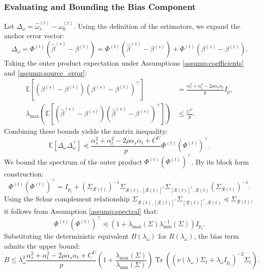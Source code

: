 \documentclass{article}
\begin{document}
\subsubsection{Evaluating and Bounding the Bias Component}
Let $\Delta_\omega = \hat\omega_s^{(t)} - \omega_0^{(t)}$. Using the definition of the estimators, we expand the anchor error vector:
\begin{equation}
\Delta_\omega = \Phi^{(t)}(\hat\beta^{(s)} - \beta^{(t)}) = \Phi^{(t)}(\hat\beta^{(s)} - \beta^{(s)}) + \Phi^{(t)}(\beta^{(s)} - \beta^{(t)}).
\end{equation}
Taking the outer product expectation under Assumptions \ref{assump:coefficients} and \ref{assump:source_error}:
\begin{align}
\mathbb{E}[(\beta^{(s)} - \beta^{(t)})(\beta^{(s)} - \beta^{(t)})^\top] &= \frac{\alpha_s^2 + \alpha_t^2 - 2 \rho \alpha_s \alpha_t}{p} I_p, \\
\lambda_{\max}\left(\mathbb{E}[(\hat\beta^{(s)} - \beta^{(s)})(\hat\beta^{(s)} - \beta^{(s)})^\top]\right) &\le \frac{C^U}{p}.
\end{align}
Combining these bounds yields the matrix inequality:
\begin{equation}
\mathbb{E}[\Delta_\omega \Delta_\omega^\top] \preceq \frac{\alpha_s^2 + \alpha_t^2 - 2 \rho \alpha_s \alpha_t + C^U}{p} \Phi^{(t)} (\Phi^{(t)})^\top.
\end{equation}
We bound the spectrum of the outer product $\Phi^{(t)} (\Phi^{(t)})^\top$. By its block form construction:
\begin{equation}
\Phi^{(t)} (\Phi^{(t)})^\top = I_{p_t} + \left(\Sigma_{\mathcal{R}(t)}\right)^{-1} \Sigma_{\mathcal{R}(t), [\mathcal{R}(t)]^c} \Sigma_{[\mathcal{R}(t)]^c, \mathcal{R}(t)} \left(\Sigma_{\mathcal{R}(t)}\right)^{-1}.
\end{equation}
Using the Schur complement relationship $\Sigma_{\mathcal{R}(t), [\mathcal{R}(t)]^c} \Sigma_{[\mathcal{R}(t)]^c, \mathcal{R}(t)} \preceq \Sigma_{\mathcal{R}(t)}$, it follows from Assumption \ref{assump:spectral} that:
\begin{equation}
\Phi^{(t)} (\Phi^{(t)})^\top \preceq \left(1 + \lambda_{\max}(\Sigma)\lambda_{\min}^{-1}(\Sigma)\right) I_{p_t}.
\end{equation}
Substituting the deterministic equivalent $B(\lambda_\omega)$ for $R(\lambda_\omega)$, the bias term admits the upper bound:
\begin{equation}
B \le \lambda_\omega^2 \frac{\alpha_s^2 + \alpha_t^2 - 2 \rho \alpha_s \alpha_t + C^U}{p} \left(1 + \frac{\lambda_{\max}(\Sigma)}{\lambda_{\min}(\Sigma)}\right) \operatorname{Tr}\left( (v(\lambda_\omega)\Sigma_t + \lambda_\omega I_{p_t})^{-2} \Sigma_t \right).
\end{equation}
\end{document}
